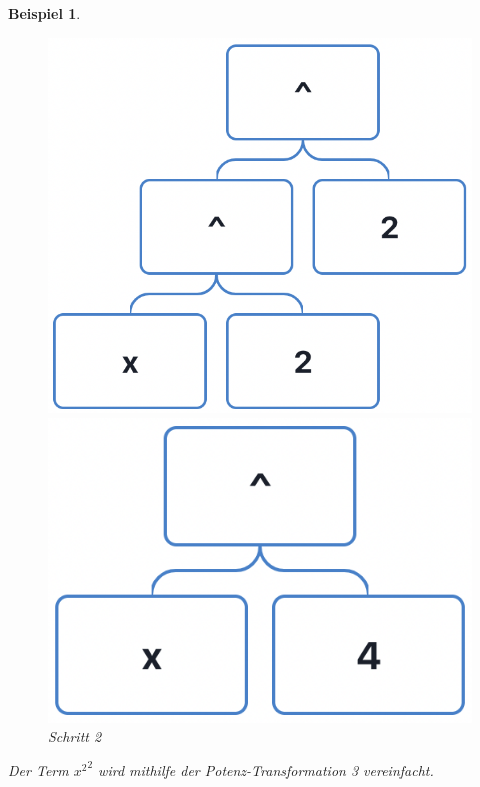 \documentclass[11pt]{article}
\newtheorem{example}{Beispiel}
\begin{document}
\begin{example}
  \begin{figure}[h]
    \begin{minipage}{.5\textwidth}
      \centering
      \includegraphics[scale=0.4]{trees/power/beispiel_2_1.png}
      \caption{Schritt 1}
    \end{minipage}
    \begin{minipage}{.5\textwidth}
      \centering
      \includegraphics[scale=0.4]{trees/power/beispiel_2_2.png}
      \caption{Schritt 2}
    \end{minipage}
  \end{figure}
  Der Term ${x^2}^2$ wird mithilfe der Potenz-Transformation 3 vereinfacht. 
\end{example}
\end{document}
